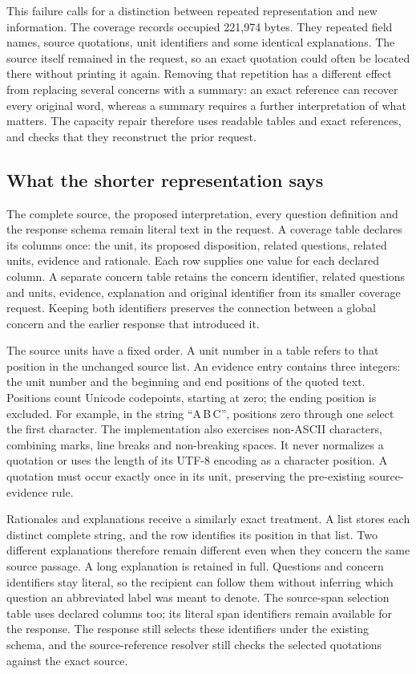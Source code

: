\documentclass[12pt,a4paper,oneside,openany]{book}
\begin{document}
This failure calls for a distinction between repeated representation and new
information. The coverage records occupied 221,974 bytes. They repeated field
names, source quotations, unit identifiers and some identical explanations.
The source itself remained in the request, so an exact quotation could often be
located there without printing it again. Removing that repetition has a
different effect from replacing several concerns with a summary: an exact
reference can recover every original word, whereas a summary requires a further
interpretation of what matters. The capacity repair therefore uses readable
tables and exact references, and checks that they reconstruct the prior request.

\subsection{What the shorter representation says}

The complete source, the proposed interpretation, every question definition and
the response schema remain literal text in the request. A coverage table
declares its columns once: the unit, its proposed disposition, related questions,
related units, evidence and rationale. Each row supplies one value for each
declared column. A separate concern table retains the concern identifier, related
questions and units, evidence, explanation and original identifier from its
smaller coverage request. Keeping both identifiers preserves the connection
between a global concern and the earlier response that introduced it.

The source units have a fixed order. A unit number in a table refers to that
position in the unchanged source list. An evidence entry contains three
integers: the unit number and the beginning and end positions of the quoted
text. Positions count Unicode codepoints, starting at zero; the ending position
is excluded. For example, in the string ``A\,B\,C'', positions zero through
one select the first character. The implementation also exercises non-ASCII
characters, combining marks, line breaks and non-breaking spaces. It never
normalizes a quotation or uses the length of its UTF-8 encoding as a character
position. A quotation must occur exactly once in its unit, preserving the
pre-existing source-evidence rule.

Rationales and explanations receive a similarly exact treatment. A list stores
each distinct complete string, and the row identifies its position in that list.
Two different explanations therefore remain different even when they concern
the same source passage. A long explanation is retained in full. Questions and
concern identifiers stay literal, so the recipient can follow them without
inferring which question an abbreviated label was meant to denote. The
source-span selection table uses declared columns too; its literal span
identifiers remain available for the response. The response still selects these
identifiers under the existing schema, and the source-reference resolver still
checks the selected quotations against the exact source.
\end{document}
